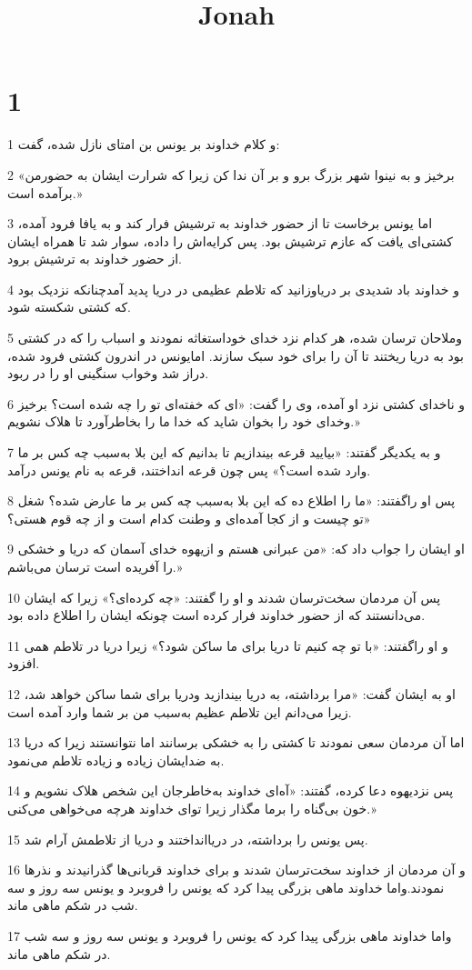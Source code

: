 

\title{Jonah}


\chapter{1}

\par 1 و کلام خداوند بر یونس بن امتای نازل شده، گفت:
\par 2 «برخیز و به نینوا شهر بزرگ برو و بر آن ندا کن زیرا که شرارت ایشان به حضورمن برآمده است.»
\par 3 اما یونس برخاست تا از حضور خداوند به ترشیش فرار کند و به یافا فرود آمده، کشتی‌ای یافت که عازم ترشیش بود. پس کرایه‌اش را داده، سوار شد تا همراه ایشان از حضور خداوند به ترشیش برود.
\par 4 و خداوند باد شدیدی بر دریاوزانید که تلاطم عظیمی در دریا پدید آمدچنانکه نزدیک بود که کشتی شکسته شود.
\par 5 وملاحان ترسان شده، هر کدام نزد خدای خوداستغاثه نمودند و اسباب را که در کشتی بود به دریا ریختند تا آن را برای خود سبک سازند. امایونس در اندرون کشتی فرود شده، دراز شد وخواب سنگینی او را در ربود.
\par 6 و ناخدای کشتی نزد او آمده، وی را گفت: «ای که خفته‌ای تو را چه شده است؟ برخیز وخدای خود را بخوان شاید که خدا ما را بخاطرآورد تا هلاک نشویم.»
\par 7 و به یکدیگر گفتند: «بیایید قرعه بیندازیم تا بدانیم که این بلا به‌سبب چه کس بر ما وارد شده است؟» پس چون قرعه انداختند، قرعه به نام یونس درآمد.
\par 8 پس او راگفتند: «ما را اطلاع ده که این بلا به‌سبب چه کس بر ما عارض شده؟ شغل تو چیست و از کجا آمده‌ای و وطنت کدام است و از چه قوم هستی؟»
\par 9 او ایشان را جواب داد که: «من عبرانی هستم و ازیهوه خدای آسمان که دریا و خشکی را آفریده است ترسان می‌باشم.»
\par 10 پس آن مردمان سخت‌ترسان شدند و او را گفتند: «چه کرده‌ای؟» زیرا که ایشان می‌دانستند که از حضور خداوند فرار کرده است چونکه ایشان را اطلاع داده بود.
\par 11 و او راگفتند: «با تو چه کنیم تا دریا برای ما ساکن شود؟» زیرا دریا در تلاطم همی افزود.
\par 12 او به ایشان گفت: «مرا برداشته، به دریا بیندازید ودریا برای شما ساکن خواهد شد، زیرا می‌دانم این تلاطم عظیم به‌سبب من بر شما وارد آمده است.
\par 13 اما آن مردمان سعی نمودند تا کشتی را به خشکی برسانند اما نتوانستند زیرا که دریا به ضدایشان زیاده و زیاده تلاطم می‌نمود.
\par 14 پس نزدیهوه دعا کرده، گفتند: «آه‌ای خداوند به‌خاطرجان این شخص هلاک نشویم و خون بی‌گناه را برما مگذار زیرا تو‌ای خداوند هر‌چه می‌خواهی می‌کنی.»
\par 15 پس یونس را برداشته، در دریاانداختند و دریا از تلاطمش آرام شد.
\par 16 و آن مردمان از خداوند سخت‌ترسان شدند و برای خداوند قربانی‌ها گذرانیدند و نذرها نمودند.واما خداوند ماهی بزرگی پیدا کرد که یونس را فروبرد و یونس سه روز و سه شب در شکم ماهی ماند.
\par 17 واما خداوند ماهی بزرگی پیدا کرد که یونس را فروبرد و یونس سه روز و سه شب در شکم ماهی ماند.


